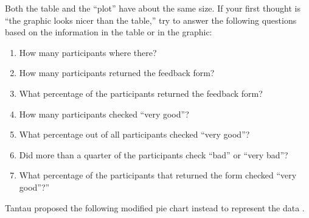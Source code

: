 \begin{example}
\begin{Quote}
\bigskip

Both the table and the ``plot'' have about the same size. If your first
thought is ``the graphic looks nicer than the table,'' try to answer
the following questions based on the information in the table or in
the graphic:
\begin{enumerate}
\item
  How many participants where there?
\item
  How many participants returned the feedback form?
\item
  What percentage of the participants returned the feedback form?
\item
  How many participants checked ``very good''?
\item
  What percentage out of all participants checked ``very good''?
\item
  Did more than a quarter of the participants check ``bad'' or ``very bad''?
\item
  What percentage of the participants that returned the form checked ``very good''?''
\end{enumerate}

Tantau proposed the following modified pie chart instead to represent the data \parencite*{tantau}.

\end{Quote}
\end{example}
